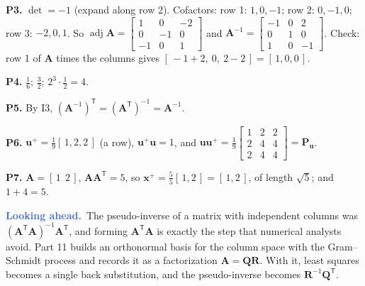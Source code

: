 \documentclass[11pt]{article}
\theoremstyle{plain}
\theoremstyle{definition}
\theoremstyle{remark}
\newcommand{\lookahead}{\par\smallskip\noindent
  \textbf{\sffamily\textcolor{RoyalBlue}{Looking ahead.}}\ \ignorespaces}
\newcommand{\vc}[1]{\mathbf{#1}}
\newcommand{\mt}[1]{\mathbf{#1}}
\newcommand{\T}{^{\mathsf{T}}}
\DeclareMathOperator{\adj}{adj}
\begin{document}
\smallskip
\noindent\textbf{P3.} $\det=-1$ (expand along row 2). Cofactors: row 1:
$1,0,-1$; row 2: $0,-1,0$; row 3: $-2,0,1$. So
$\adj\mt{A}=\begin{bmatrix}1&0&-2\\0&-1&0\\-1&0&1\end{bmatrix}$ and
$\mt{A}^{-1}=\begin{bmatrix}-1&0&2\\0&1&0\\1&0&-1\end{bmatrix}$. Check: row 1 of
$\mt{A}$ times the columns gives $[\,-1+2,\ 0,\ 2-2\,]=[\,1,0,0\,]$. \checkmark

\smallskip
\noindent\textbf{P4.} $\frac16$; $\frac{3}{2}$; $2^{3}\cdot\frac12=4$.

\smallskip
\noindent\textbf{P5.} By I3, $(\mt{A}^{-1})\T=(\mt{A}\T)^{-1}=\mt{A}^{-1}$.

\smallskip
\noindent\textbf{P6.} $\vc{u}^{+}=\frac19[\,1,2,2\,]$ (a row), $\vc{u}^{+}\vc{u}=1$,
and $\vc{u}\vc{u}^{+}=\frac19\begin{bmatrix}1&2&2\\2&4&4\\2&4&4\end{bmatrix}=\mt{P}_{\vc{u}}$.

\smallskip
\noindent\textbf{P7.} $\mt{A}=[\,1\ \ 2\,]$, $\mt{A}\mt{A}\T=5$, so
$\vc{x}^{+}=\frac{5}{5}[\,1,2\,]=[\,1,2\,]$, of length $\sqrt5$; and $1+4=5$.
\checkmark

\lookahead The pseudo-inverse of a matrix with independent columns was
$(\mt{A}\T\mt{A})^{-1}\mt{A}\T$, and forming $\mt{A}\T\mt{A}$ is exactly the step
that numerical analysts avoid. Part 11 builds an orthonormal basis for the column
space with the Gram--Schmidt process and records it as a factorization
$\mt{A}=\mt{Q}\mt{R}$. With it, least squares becomes a single back substitution,
and the pseudo-inverse becomes $\mt{R}^{-1}\mt{Q}\T$.
\end{document}
